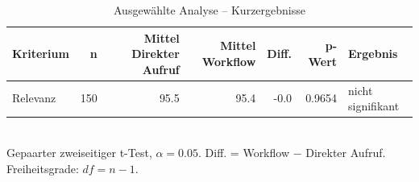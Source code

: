 \begin{table}[htbp]
\centering
\caption{Ausgewählte Analyse -- Kurzergebnisse}
\begin{tabular}{lrrrrrl}
\toprule
Kriterium & n & Mittel Direkter Aufruf & Mittel Workflow & Diff. & p-Wert & Ergebnis \\
\midrule
Relevanz & 150 & 95.5 & 95.4 & -0.0 & 0.9654 & nicht signifikant \\
\bottomrule
\end{tabular}
\\[2mm]
\footnotesize Gepaarter zweiseitiger t-Test, $\alpha=0.05$. Diff. = Workflow $-$ Direkter Aufruf. Freiheitsgrade: $df=n-1$.
\end{table}
